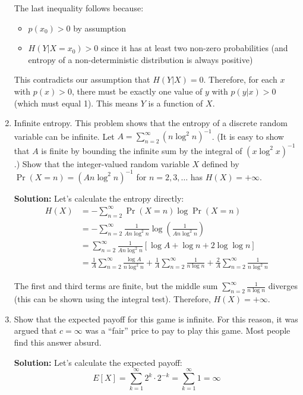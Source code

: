 \documentclass{article}
\begin{document}
\begin{enumerate}
    The last inequality follows because:
    \begin{itemize}
        \item $p(x_0) > 0$ by assumption
        \item $H(Y|X=x_0) > 0$ since it has at least two non-zero probabilities (and entropy of a non-deterministic distribution is always positive)
    \end{itemize}
    
    This contradicts our assumption that $H(Y|X) = 0$. Therefore, for each $x$ with $p(x) > 0$, there must be exactly one value of $y$ with $p(y|x) > 0$ (which must equal 1). This means $Y$ is a function of $X$.

    \item Infinite entropy. This problem shows that the entropy of a discrete random variable can be infinite. Let $A = \sum_{n=2}^{\infty} (n \log^2 n)^{-1}$. (It is easy to show that $A$ is finite by bounding the infinite sum by the integral of $(x \log^2 x)^{-1}$.) Show that the integer-valued random variable $X$ defined by $\Pr(X=n) = (An \log^2 n)^{-1}$ for $n = 2,3,\ldots$ has $H(X) = +\infty$.

    \textbf{Solution:} Let's calculate the entropy directly:
    \begin{align*}
        H(X) &= -\sum_{n=2}^{\infty} \Pr(X=n) \log \Pr(X=n) \\
        &= -\sum_{n=2}^{\infty} \frac{1}{An \log^2 n} \log\left(\frac{1}{An \log^2 n}\right) \\
        &= \sum_{n=2}^{\infty} \frac{1}{An \log^2 n} \left[\log A + \log n + 2\log\log n\right] \\
        &= \frac{1}{A}\sum_{n=2}^{\infty} \frac{\log A}{n \log^2 n} + \frac{1}{A}\sum_{n=2}^{\infty} \frac{1}{n \log n} + \frac{2}{A}\sum_{n=2}^{\infty} \frac{1}{n \log^2 n}
    \end{align*}
    
    The first and third terms are finite, but the middle sum $\sum_{n=2}^{\infty} \frac{1}{n \log n}$ diverges (this can be shown using the integral test). Therefore, $H(X) = +\infty$.

    \item Show that the expected payoff for this game is infinite. For this reason, it was argued that $c = \infty$ was a ``fair'' price to pay to play this game. Most people find this answer absurd.
    
    \textbf{Solution:} Let's calculate the expected payoff:
    \[
        E[X] = \sum_{k=1}^{\infty} 2^k \cdot 2^{-k} = \sum_{k=1}^{\infty} 1 = \infty
    \]
    

\end{enumerate}
\end{document}
